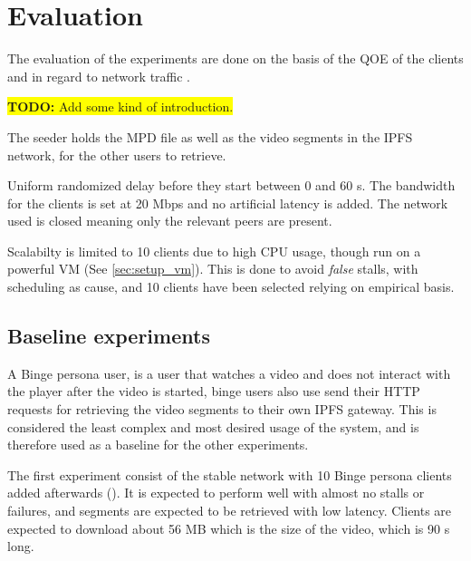 \chapter{Evaluation}
\label{cha:evaluation}

The evaluation of the experiments are done on the basis of the \ac{QOE} of the clients and in regard to network traffic \cite{nguyen2009p2p}.

\colorbox{yellow}{\textbf{TODO:} Add some kind of introduction.}

The seeder holds the \ac{MPD} file as well as the video segments in the \ac{IPFS} network, for the other users to retrieve. 

Uniform randomized delay before they start between 0 and 60 \acs{s}.
The bandwidth for the clients is set at 20 \ac{Mbps} and no artificial latency is added.
The network used is closed meaning only the relevant peers are present.

Scalabilty is limited to 10 clients due to high CPU usage, though run on a powerful \ac{VM} (See \autoref{sec:setup_vm}). This is done to avoid \textit{false} stalls, with scheduling as cause, and 10 clients have been selected relying on empirical basis.  

\section{Baseline experiments}
\label{sec:eval_baseline}
A Binge persona user, is a user that watches a video and does not interact with the player after the video is started, binge users also use send their \ac{HTTP} requests for retrieving the video segments to their own \ac{IPFS} gateway. This is considered the least complex and most desired usage of the system, and is therefore used as a baseline for the other experiments.

The first experiment consist of the stable network with 10 Binge persona clients added afterwards  (). It is expected to perform well with almost no stalls or failures, and segments are expected to be retrieved with low latency. Clients are expected to download about 56 \ac{MB} which is the size of the video, which is 90 \acs{s} long.

